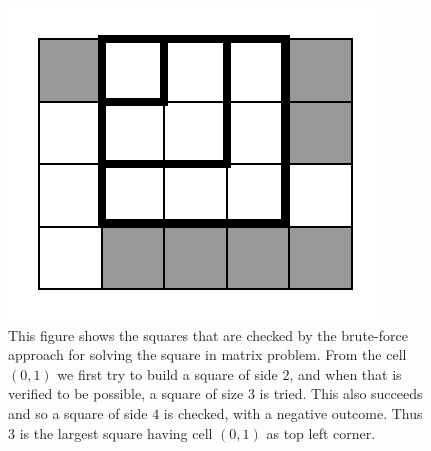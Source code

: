 \begin{figure}
	\centering
	\label{fig:square_in_matrix:squa_matrix_incremental}
	\includegraphics[width=\textwidth/2]{sources/square_in_matrix/images/squa_matrix_incremental}
	\caption[Square in matrix - Brute-force incremental square construction.]{This figure shows  the
	squares that are checked by the brute-force approach for solving the square in matrix problem.
	From the cell $(0,1)$ we first try to build a square of side $2$, and when that is verified to
	be possible, a square of size $3$ is tried. This also succeeds and so a square of side $4$ is
	checked, with a negative outcome. Thus $3$ is the largest square having cell $(0,1)$ as top left
	corner. }
\end{figure}

